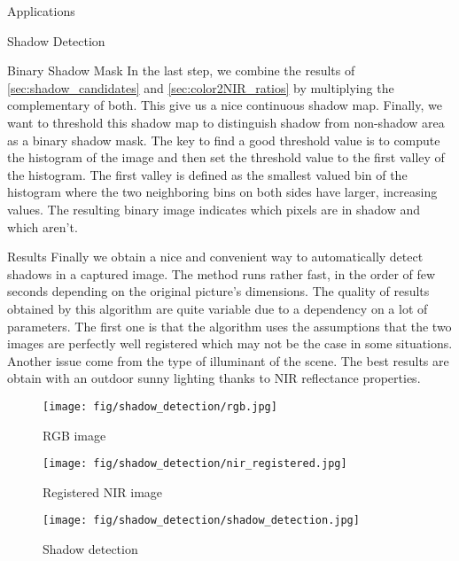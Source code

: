 \documentclass[10pt]{article}
\begin{document}
\begin{section}{Applications}
\begin{subsection}{Shadow Detection}
        \begin{subsubsection}{Binary Shadow Mask}
            \label{sec:binary_shadow_mask}
            In the last step, we combine the results of \ref{sec:shadow_candidates} and \ref{sec:color2NIR_ratios} by multiplying the complementary of both. This give us a nice continuous shadow map. Finally, we want to threshold this shadow map to distinguish shadow from non-shadow area as a binary shadow mask. The key to find a good threshold value is to compute the histogram of the image and then set the threshold value to the first valley of the histogram. The first valley is defined as the smallest valued bin of the histogram where the two neighboring bins on both sides have larger, increasing values. The resulting binary image indicates which pixels are in shadow and which aren't.

        \end{subsubsection}

        \begin{subsubsection}{Results}
            \label{sec:shadow_results}
            Finally we obtain  a nice and convenient way to automatically detect shadows in a captured image. The method runs rather fast, in the order of few seconds depending on the original picture's dimensions. The quality of results obtained by this algorithm are quite variable due to a dependency on a lot of parameters. The first one is that the algorithm uses the assumptions that the two images are perfectly well registered which may not be the case in some situations. Another issue come from the type of illuminant of the scene. The best results are obtain with an outdoor sunny lighting thanks to NIR reflectance properties.

            \begin{figure}[!h]
                \centering
                \begin{minipage}[b]{0.32\textwidth}
                    \texttt{[image: fig/shadow\_detection/rgb.jpg]}
                    \caption{RGB image}
                \end{minipage} \hspace{0.1em} %
                \begin{minipage}[b]{0.32\textwidth}
                    \texttt{[image: fig/shadow\_detection/nir\_registered.jpg]}
                    \caption{Registered NIR image}
                \end{minipage} \hspace{0.1em} %
                \begin{minipage}[b]{0.32\textwidth}
                    \texttt{[image: fig/shadow\_detection/shadow\_detection.jpg]}
                    \caption{Shadow detection}
                \end{minipage}
            \end{figure}


        \end{subsubsection}

    \end{subsection}

\end{section}
\end{document}
